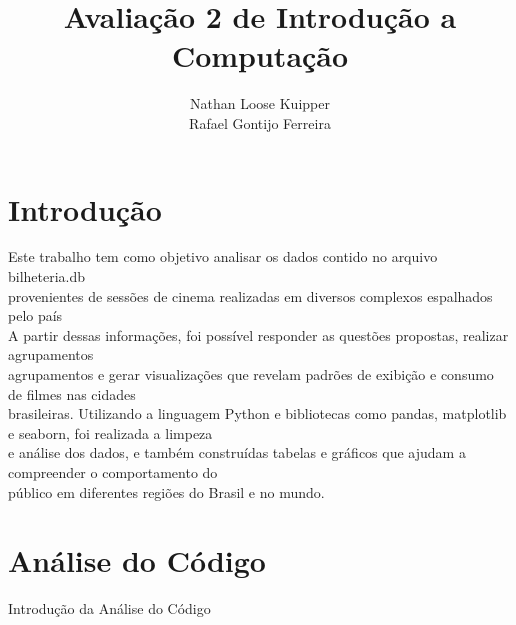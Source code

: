 \documentclass{article}
\title{Avaliação 2 de Introdução a Computação}
\author{Nathan Loose Kuipper \\ Rafael Gontijo Ferreira}
\begin{document}
\maketitle

\begin{abstract}

\lipsum[1-4]  %
\end{abstract}
\pagebreak
\section{Introdução}
 Este trabalho tem como objetivo analisar os dados contido no arquivo bilheteria.db\\
provenientes de sessões de cinema realizadas em diversos complexos espalhados pelo país\\
A partir dessas informações, foi possível responder as questões propostas, realizar agrupamentos\\
agrupamentos e gerar visualizações que revelam padrões de exibição e consumo de filmes nas cidades \\
brasileiras.
 Utilizando a linguagem Python e bibliotecas como pandas, matplotlib e seaborn, foi realizada a limpeza\\
e análise dos dados, e também construídas tabelas e gráficos que ajudam a compreender o comportamento do \\
público em diferentes regiões do Brasil e no mundo.



\section{Análise do Código}
Introdução da Análise do Código
\end{document}
